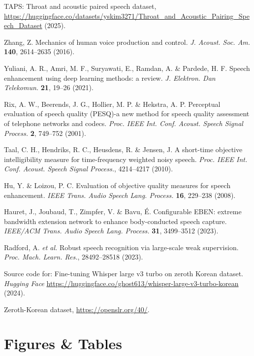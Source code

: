 \documentclass[10pt]{wlscirep}
\begin{document}
\begin{thebibliography}{99}
TAPS: Throat and acoustic paired speech dataset, \url{https://huggingface.co/datasets/yskim3271/Throat_and_Acoustic_Pairing_Speech_Dataset} (2025).

Zhang, Z. Mechanics of human voice production and control.
\textit{J. Acoust. Soc. Am.} \textbf{140}, 2614–2635 (2016).

Yuliani, A. R., Amri, M. F., Suryawati, E., Ramdan, A. \& Pardede, H. F. Speech enhancement using deep learning methods: a review.
\textit{J. Elektron. Dan Telekomun.} \textbf{21}, 19–26 (2021).

Rix, A. W., Beerends, J. G., Hollier, M. P. \& Hekstra, A. P. Perceptual evaluation of speech quality (PESQ)-a new method for speech quality assessment of telephone networks and codecs.
\textit{Proc. IEEE Int. Conf. Acoust. Speech Signal Process.} \textbf{2}, 749–752 (2001).

Taal, C. H., Hendriks, R. C., Heusdens, R. \& Jensen, J. A short-time objective intelligibility measure for time-frequency weighted noisy speech.
\textit{Proc. IEEE Int. Conf. Acoust. Speech Signal Process.}, 4214–4217 (2010).

Hu, Y. \& Loizou, P. C. Evaluation of objective quality measures for speech enhancement.
\textit{IEEE Trans. Audio Speech Lang. Process.} \textbf{16}, 229–238 (2008).

Hauret, J., Joubaud, T., Zimpfer, V. \& Bavu, É. Configurable EBEN: extreme bandwidth extension network to enhance body-conducted speech capture.
\textit{IEEE/ACM Trans. Audio Speech Lang. Process.} \textbf{31}, 3499–3512 (2023).

Radford, A. \textit{et al.} Robust speech recognition via large-scale weak supervision. \textit{Proc. Mach. Learn. Res.}, 28492–28518 (2023).

Source code for: Fine-tuning Whisper large v3 turbo on zeroth Korean dataset. \textit{Hugging Face} \url{https://huggingface.co/ghost613/whisper-large-v3-turbo-korean} (2024).

Zeroth-Korean dataset, \url{https://openslr.org/40/}.

\end{thebibliography}


\section*{Figures \& Tables}
\end{document}
